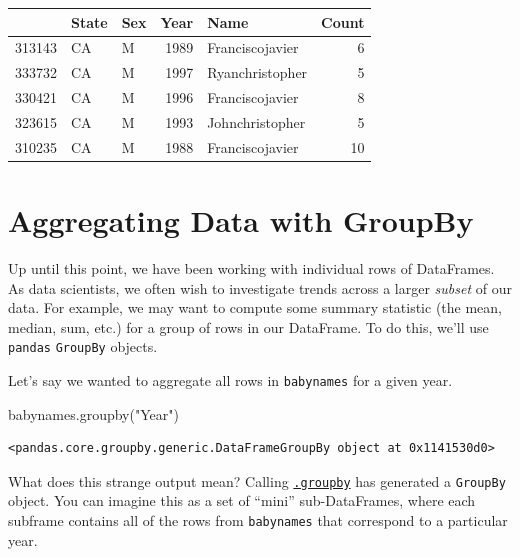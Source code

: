 \documentclass[
  letterpaper,
  DIV=11,
  numbers=noendperiod]{scrreprt}
\newenvironment{Shaded}{\begin{snugshade}}{\end{snugshade}}
\newcommand{\NormalTok}[1]{\textcolor[rgb]{0.00,0.23,0.31}{#1}}
\newcommand{\StringTok}[1]{\textcolor[rgb]{0.13,0.47,0.30}{#1}}
\begin{document}
\begin{tabular}{lllrlr}
\toprule
{} & State & Sex &  Year &             Name &  Count \\
\midrule
313143 &    CA &   M &  1989 &  Franciscojavier &      6 \\
333732 &    CA &   M &  1997 &  Ryanchristopher &      5 \\
330421 &    CA &   M &  1996 &  Franciscojavier &      8 \\
323615 &    CA &   M &  1993 &  Johnchristopher &      5 \\
310235 &    CA &   M &  1988 &  Franciscojavier &     10 \\
\bottomrule
\end{tabular}

\hypertarget{aggregating-data-with-groupby}{%
\section{Aggregating Data with
GroupBy}\label{aggregating-data-with-groupby}}

Up until this point, we have been working with individual rows of
DataFrames. As data scientists, we often wish to investigate trends
across a larger \emph{subset} of our data. For example, we may want to
compute some summary statistic (the mean, median, sum, etc.) for a group
of rows in our DataFrame. To do this, we'll use \texttt{pandas}
\texttt{GroupBy} objects.

Let's say we wanted to aggregate all rows in \texttt{babynames} for a
given year.

\begin{Shaded}
\begin{Highlighting}[]
\NormalTok{babynames.groupby(}\StringTok{"Year"}\NormalTok{)}
\end{Highlighting}
\end{Shaded}

\begin{verbatim}
<pandas.core.groupby.generic.DataFrameGroupBy object at 0x1141530d0>
\end{verbatim}

What does this strange output mean? Calling
\href{https://pandas.pydata.org/pandas-docs/stable/reference/api/pandas.DataFrame.groupby.html}{\texttt{.groupby}}
has generated a \texttt{GroupBy} object. You can imagine this as a set
of ``mini'' sub-DataFrames, where each subframe contains all of the rows
from \texttt{babynames} that correspond to a particular year.
\end{document}
